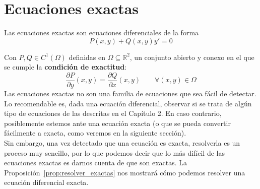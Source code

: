 \section{Ecuaciones exactas}
Las ecuaciones exactas son ecuaciones diferenciales de la forma
\begin{equation}\label{eq:exacta}
    P(x,y)+Q(x,y)y' = 0
\end{equation}

Con $P,Q\in C^1(\Omega)$ definidas en $\Omega\subseteq \mathbb{R}^2$, un conjunto abierto y conexo en el que se cumple la \textbf{condición de exactitud}:
\begin{equation*}
    \dfrac{\partial P}{\partial y}(x,y) = \dfrac{\partial Q}{\partial x}(x,y) \qquad \forall (x,y)\in \Omega
\end{equation*}
Las ecuaciones exactas no son una familia de ecuaciones que sea fácil de detectar. Lo recomendable es, dada una ecuación diferencial, observar si se trata de algún tipo de ecuaciones de las descritas en el Capítulo 2. En caso contrario, posiblemente estemos ante una ecuación exacta (o que se pueda convertir fácilmente a exacta, como veremos en la siguiente sección).\\

Sin embargo, una vez detectado que una ecuación es exacta, resolverla es un proceso muy sencillo, por lo que podemos decir que lo más difícil de las ecuaciones exactas es darnos cuenta de que son exactas. La Proposición~\ref{prop:resolver_exactas} nos mostrará cómo podemos resolver una ecuación diferencial exacta.

